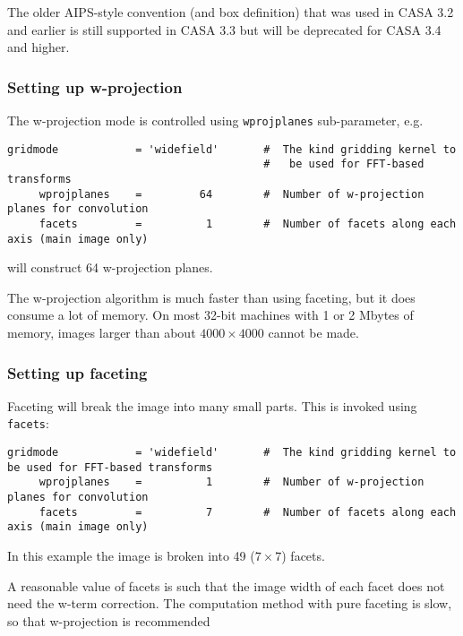The older AIPS-style convention (and box definition) that was used in
CASA 3.2 and earlier is still supported in CASA 3.3 but will be
deprecated for CASA 3.4 and higher.

\subsubsection{Setting up w-projection}
\label{section:im.clean.widefield.wproj}

The w-projection mode is controlled using {\tt wprojplanes}
sub-parameter, e.g. 
\small
\begin{verbatim}
gridmode            = 'widefield'       #  The kind gridding kernel to
                                        #   be used for FFT-based transforms
     wprojplanes    =         64        #  Number of w-projection planes for convolution
     facets         =          1        #  Number of facets along each axis (main image only)
\end{verbatim}
\normalsize
will construct 64 w-projection planes.

The w-projection algorithm is much faster than using faceting, but it does
consume a lot of memory.  On most 32-bit machines with 1 or 2 Mbytes
of memory, images larger than about $4000\times 4000$ cannot be made.

\subsubsection{Setting up faceting}
\label{section:im.clean.widefieldfacet}

Faceting will break the image into many small parts.  This
is invoked using {\tt facets}:
\small
\begin{verbatim}
gridmode            = 'widefield'       #  The kind gridding kernel to be used for FFT-based transforms
     wprojplanes    =          1        #  Number of w-projection planes for convolution
     facets         =          7        #  Number of facets along each axis (main image only)
\end{verbatim}
\normalsize
In this example the image is broken into 49 ($7\times7$) facets.

A reasonable value of facets is such that the image width of each facet
does not need the w-term correction.  The computation method with pure
faceting is slow, so that w-projection is recommended

